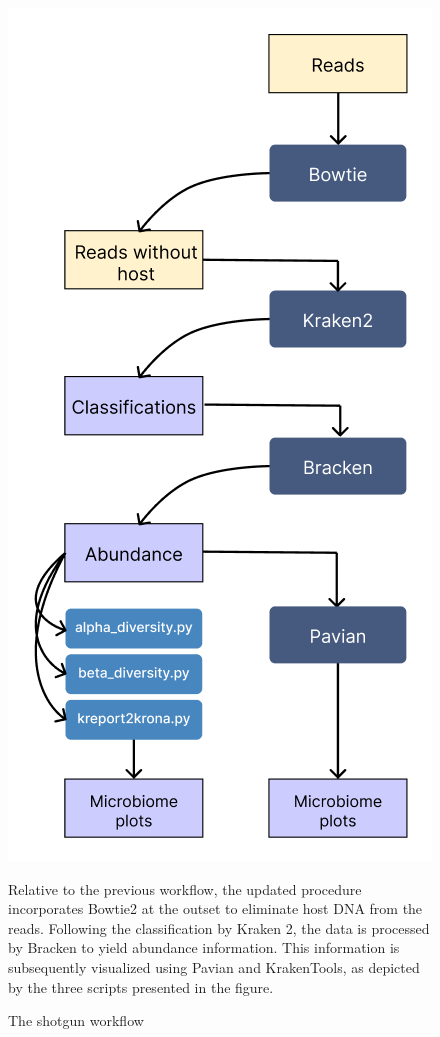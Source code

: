             \begin{figure}[H]
                \centering
                \includegraphics[scale=0.5]{images/shotgun_workflow.png}
                \caption{The shotgun workflow}
                \small Relative to the previous workflow, the updated procedure incorporates Bowtie2 at the outset to eliminate host DNA from the reads. Following the classification by Kraken 2, the data is processed by Bracken to yield abundance information. This information is subsequently visualized using Pavian and KrakenTools, as depicted by the three scripts presented in the figure.
                \label{fig:methods:new_shotgun_workflow}
            \end{figure}
            
